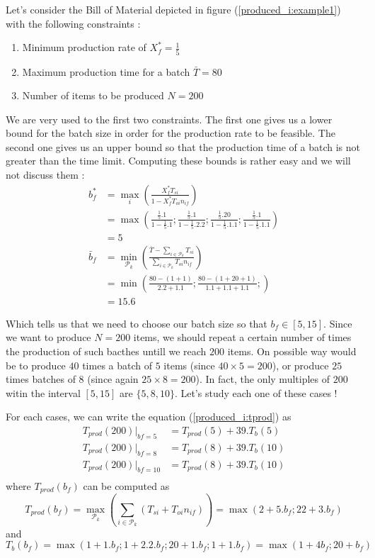Let's consider the Bill of Material depicted in figure (\ref{produced_i:example1}) with the following constraints : \begin{enumerate}
    \item Minimum production rate of $X_f^* = \frac{1}{5}$
    \item Maximum production time for a batch $\bar T = 80$
    \item Number of items to be produced $N = 200$
\end{enumerate} We are very used to the first two constraints. The first one gives us a lower bound for the batch size in order for the production rate to be feasible. The second one gives us an upper bound so that the production time of a batch is not greater than the time limit. Computing these bounds is rather easy and we will not discuss them : 
\[
    \begin{split}
        b_f^* &= \max_i\left( \frac{X_f^*T_{si}}{1-X_f^*T_{oi}n_{if}} \right)\\
              &= \max\left(
                    \frac{ \frac{1}{5} . 1 }{1 - \frac{1}{5} . 1 } ;
                    \frac{ \frac{1}{5} . 1 }{1 - \frac{1}{5} . 2 . 2 } ;
                    \frac{ \frac{1}{5} . 20 }{1 - \frac{1}{5} . 1 . 1 } ;
                    \frac{ \frac{1}{5} . 1 }{1 - \frac{1}{5} . 1 . 1 }
                  \right)\\
              &= 5\\
        \bar b_f &= \min_{\mathcal P_k}\left( \frac{\bar T - \sum_{i\in\mathcal P_k}T_{si}}{\sum_{i\in\mathcal P_k}T_{oi}n_{if}}\right)\\
                 &= \min\left(
                        \frac{80 - ( 1 + 1 )}{ 2.2 + 1.1 } ;
                        \frac{80 - ( 1 + 20 + 1 )}{ 1.1 + 1.1 + 1.1 } ;
                    \right)\\
                 &= 15.6
    \end{split}
\]

Which tells us that we need to choose our batch size so that $b_f\in [ 5, 15 ]$. Since we want to produce $N=200$ items, we should repeat a certain number of times the production of such bacthes untill we reach $200$ items. On possible way would be to produce $40$ times a batch of $5$ items (since $40\times 5 = 200$), or produce $25$ times batches of $8$ (since again $25\times 8=200$). In fact, the only multiples of $200$ witin the interval $[5, 15]$ are $\{ 5, 8, 10 \}$. Let's study each one of these cases !

For each cases, we can write the equation (\ref{produced_i:tprod}) as \[
    \begin{split}
        T_{prod}(200)|_{bf=5} &= T_{prod}(5) + 39.T_b(5)\\
        T_{prod}(200)|_{bf=8} &= T_{prod}(8) + 39.T_b(10)\\
        T_{prod}(200)|_{bf=10} &= T_{prod}(8) + 39.T_b(10)\\
    \end{split}
\] where $T_{prod}(b_f)$ can be computed as \[
    T_{prod}(b_f) = \max_{\mathcal P_k}\left( \sum_{i\in\mathcal P_k} ( T_{si} + T_{oi}n_{if} ) \right) = \max ( 2 + 5.b_f ; 22 + 3.b_f )
\] and \[ T_b(b_f) = \max( 1 + 1.b_f ; 1 + 2.2.b_f ; 20 + 1.b_f ; 1 + 1.b_f ) = \max( 1 + 4b_f ; 20 + b_f ) \]

